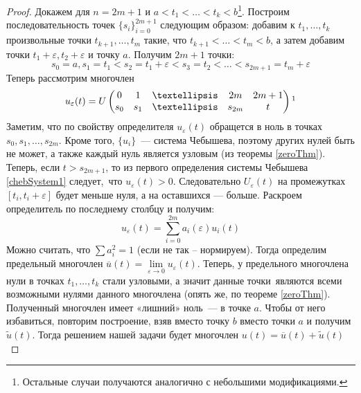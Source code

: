 \begin{proof}
Докажем для $n=2m+1$ и $a < t_1 < … < t_k < b$\footnote{Остальные случаи получаются аналогично с небольшими модификациями.}. Построим 
последовательность точек $\{s_i\}_{i=0}^{2m+1}$ следующим образом: добавим к $t_1,…, t_k$ произвольные точки $t_{k+1}, …, t_{m}$ такие, что $t_{k+1} < … < t_{m} < b$,  а затем добавим точки $t_1+\varepsilon, t_2 + \varepsilon$ и точку $a$. Получим $2m+1$ точки:
$$ s_0 = a, s_1=t_1 < s_2 = t_1 + \varepsilon < s_3 = t_2 < … < s_{2m+1} = t_{m}+\varepsilon$$
Теперь рассмотрим многочлен 
 $$u_{\varepsilon}(t) = 
    U\begin{pmatrix}
        0 & 1 & … & 2m & 2m+1 \\
        s_0 & s_1 & … & s_{2m}& t\\
    \end{pmatrix}\footnotemark  
 $$
Заметим, что по свойству определителя $u_{\varepsilon}(t)$ обращется в ноль в точках $s_0, s_1, …, s_{2m}$. Кроме того, $\{u_i\}$ — система Чебышева, поэтому других нулей быть не может, а также каждый нуль является узловым (из теоремы \eqref{zeroThm}). Теперь, если $t > s_{2m+1}$, то из первого определения системы Чебышева \eqref{chebSystem1} следует, что $u_{\varepsilon}(t) > 0$. Следовательно $U_\varepsilon(t)$ на промежутках $[t_i, t_i+\varepsilon]$ будет меньше нуля, а на оставшихся — больше. Раскроем определитель по последнему столбцу и получим:
$$ u_\varepsilon(t) = \sum\limits_{i=0}^{2m} a_i(\varepsilon)u_i(t)$$
Можно считать, что $\sum a_i^2 = 1$ (если не так – нормируем). Тогда определим предельный многочлен $\overline{u}(t) = \lim \limits_{\varepsilon \rightarrow 0} u_\varepsilon(t)$. Теперь, у предельного многочлена нули в точках $t_1, …, t_k$ стали узловыми, а значит данные точки являются всеми возможными нулями данного многочлена (опять же, по теореме \eqref{zeroThm}). Полученный многочлен имеет «лишний» ноль — в точке $a$. Чтобы от него избавиться, повторим построение, взяв вместо точку $b$ вместо точки $a$ и получим $\tilde{u}(t)$. Тогда решением нашей задачи будет многочлен
$u(t) = \overline{u}(t) + \tilde{u}(t)$
\end{proof}